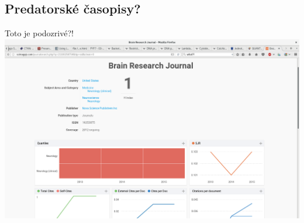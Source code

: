\documentclass{beamer}
\begin{document}
\subsection{Predatorské časopisy?}

\begin{frame}{Toto je podozrivé?!}
  \centering
  \includegraphics[scale=0.18]{brain.png}
\end{frame}
\end{document}
